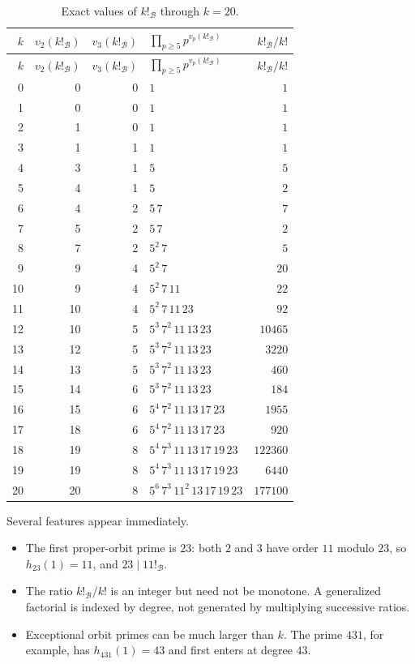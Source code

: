 \documentclass[11pt,oneside]{article}
\theoremstyle{definition}
\theoremstyle{remark}
\newcommand{\B}{\mathcal B}
\begin{document}
\begin{longtable}{@{}r r r l r@{}}
\caption{Exact values of \(k!_{\B}\) through \(k=20\).}
\label{tab:first-factorials}\\
\toprule
\(k\) & \(v_2(k!_{\B})\) & \(v_3(k!_{\B})\) &
\(\prod_{p\ge5}p^{v_p(k!_{\B})}\) & \(k!_{\B}/k!\)\\
\midrule
\endfirsthead
\toprule
\(k\) & \(v_2(k!_{\B})\) & \(v_3(k!_{\B})\) &
\(\prod_{p\ge5}p^{v_p(k!_{\B})}\) & \(k!_{\B}/k!\)\\
\midrule
\endhead
0 & 0 & 0 & $1$ & $1$ \\
1 & 0 & 0 & $1$ & $1$ \\
2 & 1 & 0 & $1$ & $1$ \\
3 & 1 & 1 & $1$ & $1$ \\
4 & 3 & 1 & $5$ & $5$ \\
5 & 4 & 1 & $5$ & $2$ \\
6 & 4 & 2 & $5\,7$ & $7$ \\
7 & 5 & 2 & $5\,7$ & $2$ \\
8 & 7 & 2 & $5^{2}\,7$ & $5$ \\
9 & 9 & 4 & $5^{2}\,7$ & $20$ \\
10 & 9 & 4 & $5^{2}\,7\,11$ & $22$ \\
11 & 10 & 4 & $5^{2}\,7\,11\,23$ & $92$ \\
12 & 10 & 5 & $5^{3}\,7^{2}\,11\,13\,23$ & $10465$ \\
13 & 12 & 5 & $5^{3}\,7^{2}\,11\,13\,23$ & $3220$ \\
14 & 13 & 5 & $5^{3}\,7^{2}\,11\,13\,23$ & $460$ \\
15 & 14 & 6 & $5^{3}\,7^{2}\,11\,13\,23$ & $184$ \\
16 & 15 & 6 & $5^{4}\,7^{2}\,11\,13\,17\,23$ & $1955$ \\
17 & 18 & 6 & $5^{4}\,7^{2}\,11\,13\,17\,23$ & $920$ \\
18 & 19 & 8 & $5^{4}\,7^{3}\,11\,13\,17\,19\,23$ & $122360$ \\
19 & 19 & 8 & $5^{4}\,7^{3}\,11\,13\,17\,19\,23$ & $6440$ \\
20 & 20 & 8 & $5^{6}\,7^{3}\,11^{2}\,13\,17\,19\,23$ & $177100$ \\
\bottomrule
\end{longtable}

Several features appear immediately.

\begin{itemize}
\item The first proper-orbit prime is \(23\): both \(2\) and \(3\) have order \(11\)
modulo \(23\), so \(h_{23}(1)=11\), and \(23\mid11!_{\B}\).
\item The ratio \(k!_{\B}/k!\) is an integer but need not be monotone.  A generalized
factorial is indexed by degree, not generated by multiplying successive ratios.
\item Exceptional orbit primes can be much larger than \(k\).  The prime \(431\), for
example, has \(h_{431}(1)=43\) and first enters at degree \(43\).
\end{itemize}
\end{document}

